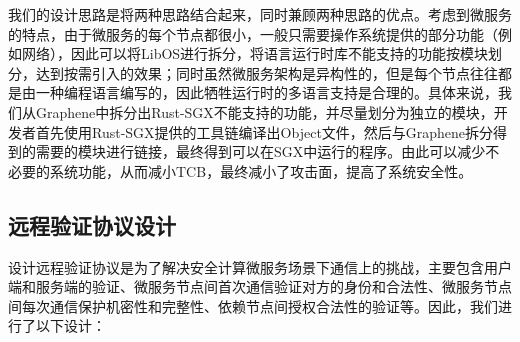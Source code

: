 我们的设计思路是将两种思路结合起来，同时兼顾两种思路的优点。考虑到微服务的特点，由于微服务的每个节点都很小，一般只需要操作系统提供的部分功能（例如网络），因此可以将LibOS进行拆分，将语言运行时库不能支持的功能按模块划分，达到按需引入的效果；同时虽然微服务架构是异构性的，但是每个节点往往都是由一种编程语言编写的，因此牺牲运行时的多语言支持是合理的。具体来说，我们从Graphene中拆分出Rust-SGX不能支持的功能，并尽量划分为独立的模块，开发者首先使用Rust-SGX提供的工具链编译出Object文件，然后与Graphene拆分得到的需要的模块进行链接，最终得到可以在SGX中运行的程序。由此可以减少不必要的系统功能，从而减小TCB，最终减小了攻击面，提高了系统安全性。

\subsection{远程验证协议设计}

设计远程验证协议是为了解决安全计算微服务场景下通信上的挑战，主要包含用户端和服务端的验证、微服务节点间首次通信验证对方的身份和合法性、微服务节点间每次通信保护机密性和完整性、依赖节点间授权合法性的验证等。因此，我们进行了以下设计：

